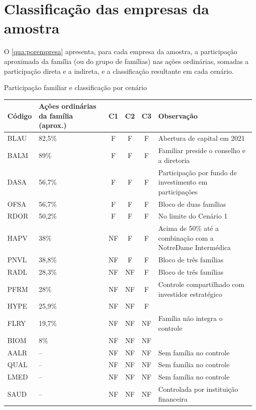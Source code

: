 \chapter{Classificação das empresas da amostra}\label{ap:classificacao}

O \autoref{qua:porempresa} apresenta, para cada empresa da amostra, a participação
aproximada da família (ou do grupo de famílias) nas ações ordinárias, somadas a
participação direta e a indireta, e a classificação resultante em cada cenário.

\begin{quadro}[htb]
\caption{Participação familiar e classificação por cenário}\label{qua:porempresa}
\centering\footnotesize
\begin{tabularx}{\textwidth}{|l|P{2.3cm}|c|c|c|L|}
\hline
\textbf{Código} & \textbf{Ações ordinárias da família (aprox.)} & \textbf{C1} & \textbf{C2} & \textbf{C3} & \textbf{Observação} \\ \hline
BLAU & 82,5\% & F & F & F & Abertura de capital em 2021 \\ \hline
BALM & 89\% & F & F & F & Familiar preside o conselho e a diretoria \\ \hline
DASA & 56,7\% & F & F & F & Participação por fundo de investimento em participações \\ \hline
OFSA & 56,7\% & F & F & F & Bloco de duas famílias \\ \hline
RDOR & 50,2\% & F & F & F & No limite do Cenário 1 \\ \hline
HAPV & 38\% & NF & F & F & Acima de 50\% até a combinação com a NotreDame Intermédica \\ \hline
PNVL & 38,8\% & NF & F & F & Bloco de três famílias \\ \hline
RADL & 28,3\% & NF & NF & F & Bloco de três famílias \\ \hline
PFRM & 28\% & NF & NF & F & Controle compartilhado com investidor estratégico \\ \hline
HYPE & 25,9\% & NF & NF & F & \\ \hline
FLRY & 19,7\% & NF & NF & NF & Família não integra o controle \\ \hline
BIOM & 8\% & NF & NF & NF & \\ \hline
AALR & -- & NF & NF & NF & Sem família no controle \\ \hline
QUAL & -- & NF & NF & NF & Sem família no controle \\ \hline
LMED & -- & NF & NF & NF & Sem família no controle \\ \hline
SAUD & -- & NF & NF & NF & Controlada por instituição financeira \\ \hline
\end{tabularx}
\end{quadro}
